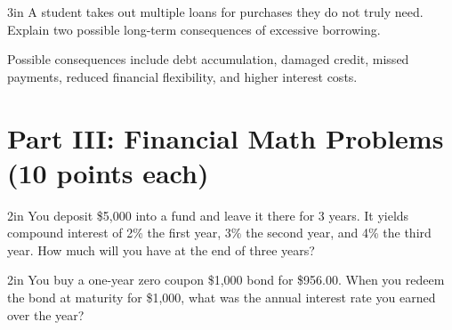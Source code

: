 \documentclass[12pt]{exam}
\begin{document}
\begin{questions}
  \begin{shortanswer}[10]{3in}
    A student takes out multiple loans for purchases they do not truly need.
    Explain two possible long-term consequences of excessive borrowing.
  \end{shortanswer}
  \begin{solution}
    Possible consequences include debt accumulation, damaged credit, missed payments, reduced financial flexibility, and higher interest costs.
  \end{solution}

  \section*{Part III: Financial Math Problems (10 points each)}

  \begin{problem}[10]{2in}
    You deposit \$5,000 into a fund and leave it there for 3 years.  It yields compound
    interest of 2\% the first year,
    3\% the second year,
    and 4\% the third year.  How much will you have at the end of three years?
  \end{problem}

  \begin{problem}[10]{2in}
    You buy a one-year zero coupon \$1,000 bond for \$956.00.  When you redeem the bond
    at maturity for \$1,000, what was the annual interest rate you earned over the year?
  \end{problem}

\end{questions}
\end{document}

